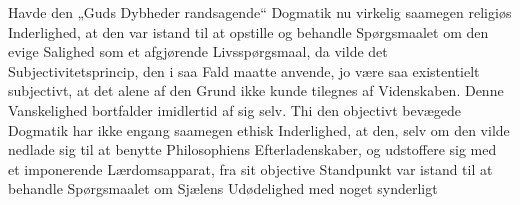 \documentclass[11pt]{book}
\newcommand{\opage}[1]{\marginnote{\footnotesize\textit{[#1]}}}
\begin{document}
Havde den „Guds Dybheder randsagende“ Dogmatik nu virkelig saamegen
religiøs Inderlighed, at den var istand til at opstille og behandle
Spørgsmaalet om den evige Salighed som et afgjørende
Livsspørgsmaal, da vilde det Subjectivitetsprincip, den i saa Fald
maatte anvende, jo være saa existentielt subjectivt, at det alene af
den Grund ikke kunde tilegnes af
\opage{47} \setcounter{footnote}{0}%
Videnskaben. Denne Vanskelighed bortfalder imidlertid af sig selv.
Thi den objectivt bevægede Dogmatik har ikke engang saamegen ethisk
Inderlighed, at den, selv om den vilde nedlade sig til at benytte
Philosophiens Efterladenskaber, og udstoffere sig med et imponerende
Lærdomsapparat, fra sit objective Standpunkt var istand til at
behandle Spørgsmaalet om Sjælens Udødelighed med noget synderligt
\end{document}

